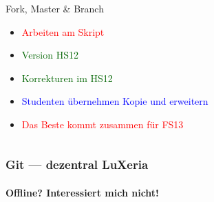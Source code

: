 \begin{frame}
\begin{columns}
\begin{column}{5cm}
\begin{block}{Fork, Master \& Branch}
\begin{itemize}
					\item \textcolor{red}{Arbeiten am Skript}
					\item \textcolor{darkgreen}{Version HS12}
					\item \textcolor{darkgreen}{Korrekturen im HS12}
					\item \textcolor{blue}{Studenten übernehmen Kopie und erweitern}
					\item \textcolor{red}{Das Beste kommt zusammen für FS13}
				\end{itemize}
			\end{block}
		\end{column}
	\end{columns}
\end{frame}

\begin{frame}
	\frametitle{Git --- dezentral \hfill{} LuXeria}
	\framesubtitle{Offline? Interessiert mich nicht!}
	\begin{columns}
		\begin{column}{5cm}
		\end{column}
		\begin{column}{5cm}
		\end{column}
	\end{columns}
\end{frame}
